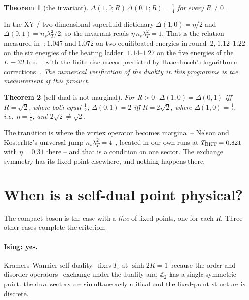 \documentclass[11pt,a4paper]{article}
\newtheorem{theorem}{Theorem}
\begin{document}
\begin{theorem}[the invariant]
$\Delta(1,0;R)\,\Delta(0,1;R)=\tfrac14$ for every $R\neq0$.
\end{theorem}
In the XY / two-dimensional-superfluid dictionary $\Delta(1,0)=\eta/2$ and $\Delta(0,1)=n_s\lambda_T^2/2$, so the
invariant reads $\eta\,n_s\lambda_T^2=1$. That is the relation measured in~\cite{Callens2026Causal}: $1.047$ and
$1.072$ on two equilibrated energies in round~2, $1.12$--$1.22$ on the six energies of the heating ladder,
$1.14$--$1.27$ on the five energies of the $L=32$ box -- with the finite-size excess predicted by
Hasenbusch's logarithmic corrections~\cite{Hasenbusch2005}. \emph{The numerical verification of the duality in
this programme is the measurement of this product.}

\begin{theorem}[self-dual is not marginal]
For $R>0$: $\Delta(1,0)=\Delta(0,1)$ iff $R=\sqrt2$, where both equal $\tfrac12$; $\Delta(0,1)=2$ iff
$R=2\sqrt2$, where $\Delta(1,0)=\tfrac18$, i.e.\ $\eta=\tfrac14$; and $2\sqrt2\neq\sqrt2$.
\end{theorem}
The transition is where the vortex operator becomes marginal -- Nelson and Kosterlitz's universal jump
$n_s\lambda_T^2=4$~\cite{NelsonKosterlitz1977}, located in our own runs at $T_{\rm BKT}=0.821$ with
$\eta=0.31$ there -- and that is a condition on one sector. The exchange symmetry has its fixed point elsewhere,
and nothing happens there.

\section{When is a self-dual point physical?}

The compact boson is the case with a \emph{line} of fixed points, one for each $R$. Three other cases complete the
criterion.

\paragraph{Ising: yes.} Kramers--Wannier self-duality~\cite{KramersWannier1941} fixes $T_c$ at $\sinh2K=1$ because
the order and disorder operators~\cite{FradkinSusskind1978} exchange under the duality and $\mathbb Z_2$ has a single
symmetric point: the dual sectors are simultaneously critical and the fixed-point structure is discrete.
\end{document}
